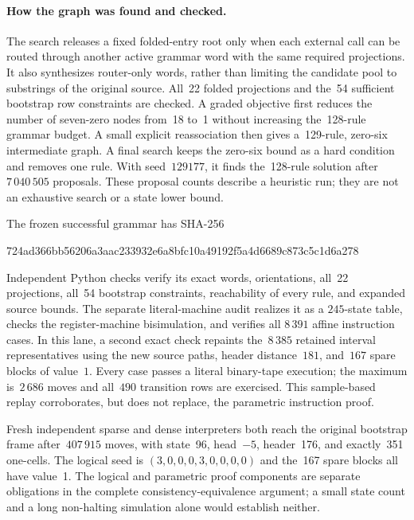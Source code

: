 \paragraph{How the graph was found and checked.}
The search releases a fixed folded-entry root only when each external call
can be routed through another active grammar word with the same required
projections.  It also synthesizes router-only words, rather than limiting the
candidate pool to substrings of the original source.  All~22 folded
projections and the~54 sufficient bootstrap row constraints are checked.
A graded objective first reduces the number of seven-zero nodes from~18 to~1
without increasing the~128-rule grammar budget.  A small explicit
reassociation then gives a~129-rule, zero-six intermediate graph.
A final search keeps the zero-six bound as a hard condition and removes one
rule.  With seed~$129177$, it finds the~128-rule solution after
$7\,040\,505$ proposals.  These proposal counts describe a heuristic run;
they are not an exhaustive search or a state lower bound.

The frozen successful grammar has SHA-256
\begin{center}\ttfamily\footnotesize
724ad366bb56206a3aac233932e6a8bfc10a49192f5a4d6689c873c5c1d6a278
\end{center}
Independent Python checks verify its exact words, orientations, all~22
projections, all~54 bootstrap constraints, reachability of every rule, and
expanded source bounds.  The separate literal-machine audit realizes it as a
$245$-state table, checks the register-machine bisimulation, and verifies all
$8\,391$ affine instruction cases.  In this lane, a second exact check
repaints the~$8\,385$ retained interval representatives using the new source
paths, header distance~$181$, and~$167$ spare blocks of value~$1$.
Every case passes a literal binary-tape execution; the maximum is~$2\,686$
moves and all~$490$ transition rows are exercised.  This sample-based replay
corroborates, but does not replace, the parametric instruction proof.

Fresh independent sparse and dense interpreters both reach the original
bootstrap frame after~$407\,915$ moves, with state~96, head~$-5$, header~176,
and exactly~351 one-cells.  The logical seed is
$(3,0,0,0,3,0,0,0,0)$ and the~167 spare blocks all have value~1.
The logical and parametric proof components are separate obligations in the
complete consistency-equivalence argument; a small state count and a long
non-halting simulation alone would establish neither.
